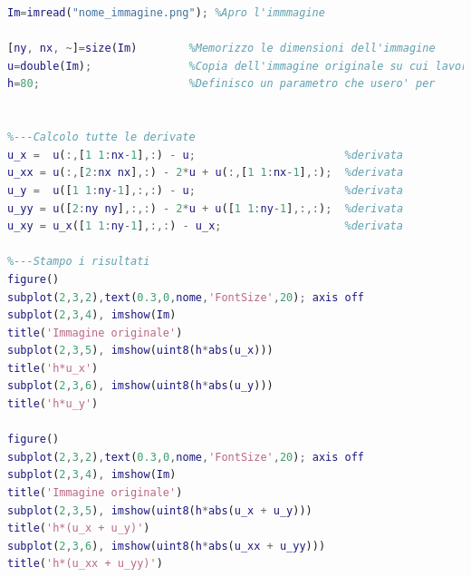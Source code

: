 \begin{lstlisting}[language=MATLAB]
%---Operazioni preliminari
Im=imread("nome_immagine.png");	%Apro l'immmagine

[ny, nx, ~]=size(Im)        %Memorizzo le dimensioni dell'immagine
u=double(Im);               %Copia dell'immagine originale su cui lavorare
h=80;                       %Definisco un parametro che usero' per                               enfatizzare i bordi in fase di stampa 


%---Calcolo tutte le derivate
u_x =  u(:,[1 1:nx-1],:) - u;                       %derivata                                                            prima lungo x
u_xx = u(:,[2:nx nx],:) - 2*u + u(:,[1 1:nx-1],:);  %derivata                                                            seconda lungo x
u_y =  u([1 1:ny-1],:,:) - u;                       %derivata                                                            prima lungo y
u_yy = u([2:ny ny],:,:) - 2*u + u([1 1:ny-1],:,:);  %derivata                                                            seconda lungo y
u_xy = u_x([1 1:ny-1],:,:) - u_x;                   %derivata                                                            seconda mista
   
%---Stampo i risultati
figure()
subplot(2,3,2),text(0.3,0,nome,'FontSize',20); axis off
subplot(2,3,4), imshow(Im)
title('Immagine originale')
subplot(2,3,5), imshow(uint8(h*abs(u_x)))
title('h*u_x')
subplot(2,3,6), imshow(uint8(h*abs(u_y)))
title('h*u_y')

figure()
subplot(2,3,2),text(0.3,0,nome,'FontSize',20); axis off
subplot(2,3,4), imshow(Im)
title('Immagine originale')
subplot(2,3,5), imshow(uint8(h*abs(u_x + u_y)))
title('h*(u_x + u_y)')
subplot(2,3,6), imshow(uint8(h*abs(u_xx + u_yy)))
title('h*(u_xx + u_yy)')
\end{lstlisting}

